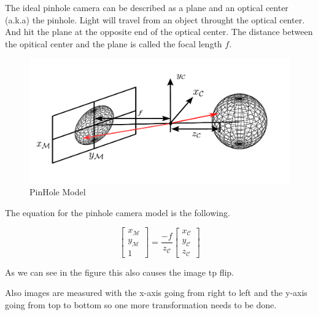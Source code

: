 \label{chap:imgpros}

\label{sec:imgintro}

\label{sec:imgpinhole}

The ideal pinhole camera can be described as a plane and an optical center (a.k.a) the pinhole. Light will travel from an object throught the optical center.
And hit the plane at the opposite end of the optical center. The distance between the opitical center and the plane is called the focal length $f$.


\begin{figure}[H]
    \centering
    \includegraphics[width=1\linewidth]{figures/imageprocessing/Pinhole.pdf}
    \caption{PinHole Model}
    \label{fig}
\end{figure}


The equation for the pinhole camera model is the following.

\begin{equation}
\begin{bmatrix}
    x_\mathcal{M} \\
    y_\mathcal{M} \\
    1 
\end{bmatrix}
= \frac{-f}{z_\mathcal{C}}
\begin{bmatrix}
    x_\mathcal{C} \\
    y_\mathcal{C} \\
    z_\mathcal{C}
\end{bmatrix}
\end{equation}

As we can see in the figure this also causes the image tp flip.

Also images are measured with the x-axis going from right to left and the y-axis going from top to bottom so one more transformation needs to be done.

